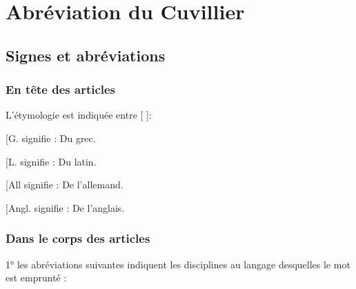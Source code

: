 \chapter{Abréviation du Cuvillier}
\section{Signes et abréviations}
\subsection {En tête des articles}
L’étymologie est indiquée entre [ ]:

\hfill
\begin{minipage}[c]{.45\linewidth}
[G. signifie : Du grec.

[L. signifie : Du latin.
\end{minipage}
\hfill
\begin{minipage}[c]{.45\linewidth}
[All signifie : De l'allemand.

[Angl. signifie : De l’anglais.
\end{minipage}

\vspace{0.311cm}

\subsection {Dans le corps des articles}
1° les abréviations suivantes indiquent les
disciplines au langage desquelles le mot est emprunté :

